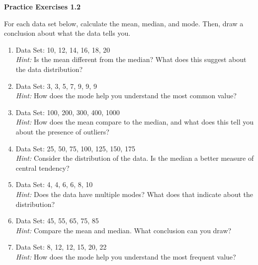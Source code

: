 \vspace{1ex}
\noindent\textbf{Practice Exercises 1.2}

\vspace{0.75ex}

For each data set below, calculate the mean, median, and mode. Then, draw a conclusion about what the data tells you.

\begin{enumerate}
    \item Data Set: 10, 12, 14, 16, 18, 20 \\
    \textit{Hint:} Is the mean different from the median? What does this suggest about the data distribution?

    \item Data Set: 3, 3, 5, 7, 9, 9, 9 \\
    \textit{Hint:} How does the mode help you understand the most common value?

    \item Data Set: 100, 200, 300, 400, 1000 \\
    \textit{Hint:} How does the mean compare to the median, and what does this tell you about the presence of outliers?

    \item Data Set: 25, 50, 75, 100, 125, 150, 175 \\
    \textit{Hint:} Consider the distribution of the data. Is the median a better measure of central tendency?

    \item Data Set: 4, 4, 6, 6, 8, 10 \\
    \textit{Hint:} Does the data have multiple modes? What does that indicate about the distribution?

    \item Data Set: 45, 55, 65, 75, 85 \\
    \textit{Hint:} Compare the mean and median. What conclusion can you draw?

    \item Data Set: 8, 12, 12, 15, 20, 22 \\
    \textit{Hint:} How does the mode help you understand the most frequent value?



\end{enumerate}
